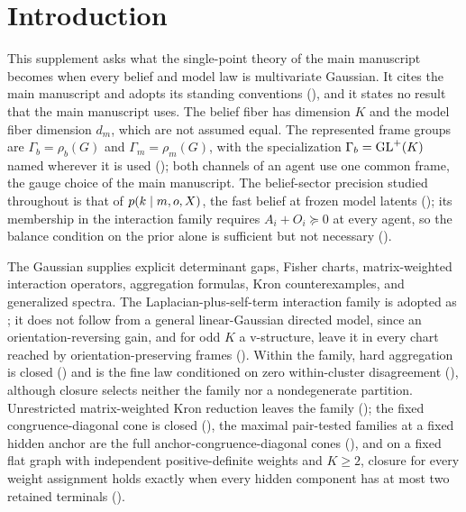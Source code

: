 \chapter{Introduction}
\label{ch:gaussian-introduction}

This supplement asks what the single-point theory of the main manuscript
becomes when every belief and model law is multivariate Gaussian. It cites the
main manuscript and adopts its standing conventions
(), and it states no result that the main
manuscript uses. The belief fiber has dimension \(K\) and the model fiber
dimension \(d_m\), which are not assumed equal. The represented frame groups
are \(\Gamma_b=\rho_b(G)\) and \(\Gamma_m=\rho_m(G)\), with the specialization
\(\Gamma_b=\mathrm{GL}^+(K)\) named wherever it is used
(); both channels of an agent use one common
frame, the gauge choice of the main manuscript. The belief-sector precision
studied throughout is that of \(p(k\mid m,o,X)\), the fast belief at frozen
model latents (); its membership in the
interaction family requires \(A_i+O_i\succeq0\) at every agent, so the balance
condition on the prior alone is sufficient but not necessary
().

The Gaussian supplies explicit determinant gaps, Fisher charts,
matrix-weighted interaction operators, aggregation formulas, Kron
counterexamples, and generalized spectra. The Laplacian-plus-self-term
interaction family is adopted as ; it does
not follow from a general linear-Gaussian directed model, since an
orientation-reversing gain, and for odd \(K\) a v-structure, leave it in every
chart reached by orientation-preserving frames
(). Within the family, hard aggregation
is closed () and is the fine law conditioned
on zero within-cluster disagreement (),
although closure selects neither the family nor a nondegenerate partition.
Unrestricted matrix-weighted Kron reduction leaves the family
(); the fixed congruence-diagonal cone is
closed (), the maximal pair-tested
families at a fixed hidden anchor are the full anchor-congruence-diagonal
cones (), and on a fixed flat
graph with independent positive-definite weights and \(K\geq2\), closure for
every weight assignment holds exactly when every hidden component has at most
two retained terminals ().

